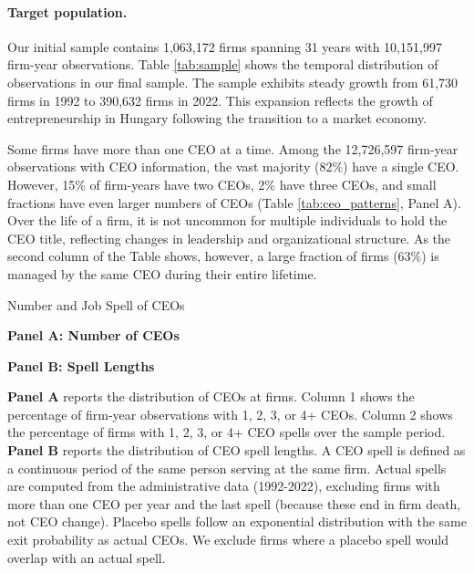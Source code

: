 \documentclass[11pt,a4paper]{article}
\begin{document}
\paragraph{Target population.} Our initial sample contains 1,063,172 firms spanning 31 years with 10,151,997 firm-year observations. Table \ref{tab:sample} shows the temporal distribution of observations in our final sample. The sample exhibits steady growth from 61,730 firms in 1992 to 390,632 firms in 2022. This expansion reflects the growth of entrepreneurship in Hungary following the transition to a market economy.



Some firms have more than one CEO at a time. Among the 12,726,597 firm-year observations with CEO information, the vast majority (82\%) have a single CEO. However, 15\% of firm-years have two CEOs, 2\% have three CEOs, and small fractions have even larger numbers of CEOs (Table \ref{tab:ceo_patterns}, Panel A). Over the life of a firm, it is not uncommon for multiple individuals to hold the CEO title, reflecting changes in leadership and organizational structure. As the second column of the Table shows, however, a large fraction of firms (63\%) is managed by the same CEO during their entire lifetime.

\begin{table}[htbp]
\centering
\caption{Number and Job Spell of CEOs}
\label{tab:ceo_patterns}
\begin{minipage}{0.48\textwidth}
\centering
\textbf{Panel A: Number of CEOs}

\end{minipage}
\hfill
\begin{minipage}{0.48\textwidth}
\centering
\textbf{Panel B: Spell Lengths}

\end{minipage}
\begin{tablenotes}[flushleft]
\footnotesize
\item\textbf{Panel A} reports the distribution of CEOs at firms. Column 1 shows the percentage of firm-year observations with 1, 2, 3, or 4+ CEOs. Column 2 shows the percentage of firms with 1, 2, 3, or 4+ CEO spells over the sample period. \textbf{Panel B} reports the distribution of CEO spell lengths. A CEO spell is defined as a continuous period of the same person serving at the same firm.
Actual spells are computed from the administrative data (1992-2022), excluding firms with more than one CEO per year and the last spell (because these end in firm death, not CEO change). Placebo spells follow an exponential distribution with the same exit probability as actual CEOs. We exclude firms where a placebo spell would overlap with an actual spell.
\end{tablenotes}
\end{table}
\end{document}
